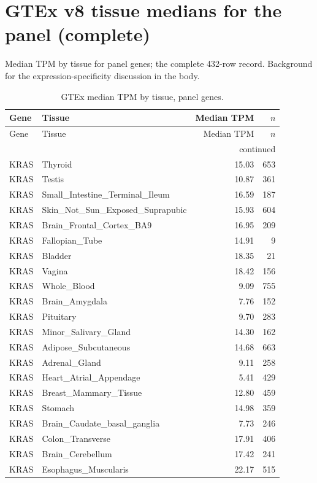 \section{GTEx v8 tissue medians for the panel (complete)}
Median TPM by tissue for panel genes; the complete 432-row record. Background for the expression-specificity discussion in the body.
\begin{footnotesize}\begin{longtable}{llrr}
\caption{GTEx median TPM by tissue, panel genes.}\\ \hline\hline
Gene & Tissue & Median TPM & $n$ \\ \hline \endfirsthead
\hline\hline Gene & Tissue & Median TPM & $n$ \\ \hline \endhead
\hline \multicolumn{4}{r}{continued}\\ \endfoot \hline\hline \endlastfoot
KRAS & Thyroid & 15.03 & 653 \\
KRAS & Testis & 10.87 & 361 \\
KRAS & Small\_Intestine\_Terminal\_Ileum & 16.59 & 187 \\
KRAS & Skin\_Not\_Sun\_Exposed\_Suprapubic & 15.93 & 604 \\
KRAS & Brain\_Frontal\_Cortex\_BA9 & 16.95 & 209 \\
KRAS & Fallopian\_Tube & 14.91 & 9 \\
KRAS & Bladder & 18.35 & 21 \\
KRAS & Vagina & 18.42 & 156 \\
KRAS & Whole\_Blood & 9.09 & 755 \\
KRAS & Brain\_Amygdala & 7.76 & 152 \\
KRAS & Pituitary & 9.70 & 283 \\
KRAS & Minor\_Salivary\_Gland & 14.30 & 162 \\
KRAS & Adipose\_Subcutaneous & 14.68 & 663 \\
KRAS & Adrenal\_Gland & 9.11 & 258 \\
KRAS & Heart\_Atrial\_Appendage & 5.41 & 429 \\
KRAS & Breast\_Mammary\_Tissue & 12.80 & 459 \\
KRAS & Stomach & 14.98 & 359 \\
KRAS & Brain\_Caudate\_basal\_ganglia & 7.73 & 246 \\
KRAS & Colon\_Transverse & 17.91 & 406 \\
KRAS & Brain\_Cerebellum & 17.42 & 241 \\
KRAS & Esophagus\_Muscularis & 22.17 & 515 \\

\end{longtable}
\end{footnotesize}

